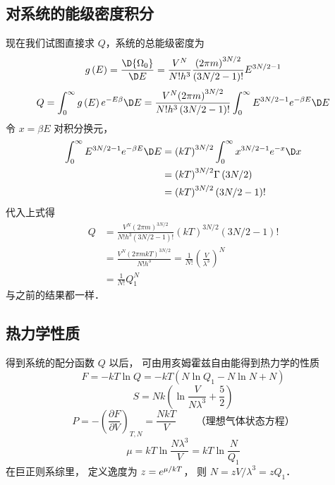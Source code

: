 \subsection{对系统的能级密度积分}
现在我们试图直接求 $Q$，系统的总能级密度为%
\begin{equation}
g\left( E \right) = \frac{{\D {\Omega _0}}}{{\D E}}  = \frac{{{V^N}}}{{N!{h^3}}}\frac{{{{\left( {2\pi m} \right)}^{3N/2}}}}{{\left( {3N/2 - 1} \right)!}}{E^{3N/2 - 1}}
\end{equation}
\begin{equation}
Q = \int_0^\infty  {g\left( E \right){e^{ - E\beta }}\D E}  = \frac{{{V^N}{{\left( {2\pi m} \right)}^{3N/2}}}}{{N!{h^3}\left( {3N/2 - 1} \right)!}}\int_0^\infty  {{E^{3N/2 - 1}}{e^{ - \beta E}}\D E}
\end{equation}
令 $x = \beta E$ 对积分换元，
\begin{equation}
\begin{aligned}
\int_0^\infty  {{E^{3N/2 - 1}}{e^{ - \beta E}}\D E} & = {\left( {kT} \right)^{3N/2}}\int_0^\infty  {{x^{3N/2 - 1}}{e^{ - x}}\D x}  \\
& = {\left( {kT} \right)^{3N/2}}\Gamma \left( {3N/2} \right) \\
& = {\left( {kT} \right)^{3N/2}}\left( {3N/2 - 1} \right)!
\end{aligned}
\end{equation}
代入上式得
\begin{equation}
\begin{aligned}
Q & = \frac{{{V^N}{{\left( {2\pi m} \right)}^{3N/2}}}}{{N!{h^3}\left( {3N/2 - 1} \right)!}}{\left( {kT} \right)^{3N/2}}(3N/2 - 1)! \\
   & = \frac{{{V^N}{{\left( {2\pi mkT} \right)}^{3N/2}}}}{{N!{h^3}}} = \frac{1}{{N!}}{\left( {\frac{V}{{{\lambda ^3}}}} \right)^N} \\
   & = \frac{1}{{N!}}Q_1^N
 \end{aligned}
 \end{equation}
 与之前的结果都一样．


\subsection{热力学性质}
 得到系统的配分函数 $Q$ 以后， 可由用亥姆霍兹自由能得到热力学的性质
 \begin{equation}
   F =  - kT\ln Q =  - kT\left( {N\ln {Q_1} - N\ln N + N} \right)
 \end{equation}
 \begin{equation}
   S = Nk\left( {\ln \frac{V}{{N{\lambda ^3}}} + \frac{5}{2}} \right)
 \end{equation}
 \begin{equation}
   P =  - {\left( {\frac{{\partial F}}{{\partial V}}} \right)_{T,N}} = \frac{{NkT}}{V} \qquad \text{（理想气体状态方程）}
 \end{equation}
 \begin{equation}
   \mu  = kT\ln \frac{{N{\lambda ^3}}}{V} = kT\ln \frac{N}{{{Q_1}}}
 \end{equation}
 在巨正则系综里， 定义逸度为 $z = {e^{{\mu  \mathord{\left/
 {\vphantom {\mu  {kT}}} \right.
 \kern-\nulldelimiterspace} {kT}}}}$，  则 $N = {{zV}}/{{{\lambda ^3}}} = z{Q_1}$． 


